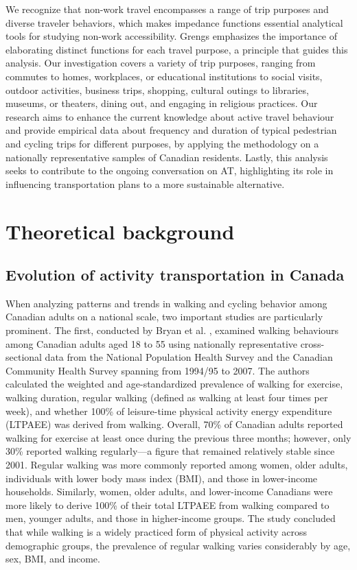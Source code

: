 \documentclass[preprint, 3p,
authoryear]{elsarticle} %
\begin{document}
We recognize that non-work travel encompasses a range of trip purposes
and diverse traveler behaviors, which makes impedance functions
essential analytical tools for studying non-work accessibility. Grengs
\citeyearpar{grengs2015nonwork} emphasizes the importance of elaborating
distinct functions for each travel purpose, a principle that guides this
analysis. Our investigation covers a variety of trip purposes, ranging
from commutes to homes, workplaces, or educational institutions to
social visits, outdoor activities, business trips, shopping, cultural
outings to libraries, museums, or theaters, dining out, and engaging in
religious practices. Our research aims to enhance the current knowledge
about active travel behaviour and provide empirical data about frequency
and duration of typical pedestrian and cycling trips for different
purposes, by applying the methodology on a nationally representative
samples of Canadian residents. Lastly, this analysis seeks to contribute
to the ongoing conversation on AT, highlighting its role in influencing
transportation plans to a more sustainable alternative.

\section{Theoretical background}\label{theoretical-background}

\subsection{Evolution of activity transportation in
Canada}\label{evolution-of-activity-transportation-in-canada}

When analyzing patterns and trends in walking and cycling behavior among
Canadian adults on a national scale, two important studies are
particularly prominent. The first, conducted by Bryan et al.
\citeyearpar{bryan2009}, examined walking behaviours among Canadian
adults aged 18 to 55 using nationally representative cross-sectional
data from the National Population Health Survey and the Canadian
Community Health Survey spanning from 1994/95 to 2007. The authors
calculated the weighted and age-standardized prevalence of walking for
exercise, walking duration, regular walking (defined as walking at least
four times per week), and whether 100\% of leisure-time physical
activity energy expenditure (LTPAEE) was derived from walking. Overall,
70\% of Canadian adults reported walking for exercise at least once
during the previous three months; however, only 30\% reported walking
regularly---a figure that remained relatively stable since 2001. Regular
walking was more commonly reported among women, older adults,
individuals with lower body mass index (BMI), and those in lower-income
households. Similarly, women, older adults, and lower-income Canadians
were more likely to derive 100\% of their total LTPAEE from walking
compared to men, younger adults, and those in higher-income groups. The
study concluded that while walking is a widely practiced form of
physical activity across demographic groups, the prevalence of regular
walking varies considerably by age, sex, BMI, and income.
\end{document}
